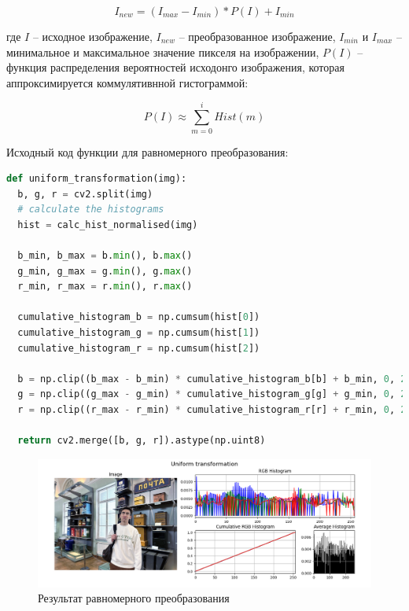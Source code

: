 \documentclass[a4paper, 12pt]{extarticle}
\begin{document}
\begin{equation}
  I_{new} = \left( I_{max} - I_{min} \right) * P(I) + I_{min}
\end{equation}

где $I$ -- исходное изображение, $I_{new}$ -- преобразованное изображение, $I_{min}$ и $I_{max}$ -- минимальное и максимальное значение пикселя на изображении, $P(I)$ -- функция распределения вероятностей исходонго изображения, которая аппроксимируется коммулятивнной гистограммой: 

\begin{equation}
  P(I) \approx \sum\limits_{m=0}^{i} Hist(m)
\end{equation}

Исходный код функции для равномерного преобразования:

\begin{lstlisting}[language=Python]
def uniform_transformation(img):
  b, g, r = cv2.split(img)
  # calculate the histograms
  hist = calc_hist_normalised(img)

  b_min, b_max = b.min(), b.max()
  g_min, g_max = g.min(), g.max()
  r_min, r_max = r.min(), r.max()

  cumulative_histogram_b = np.cumsum(hist[0]) 
  cumulative_histogram_g = np.cumsum(hist[1])
  cumulative_histogram_r = np.cumsum(hist[2])

  b = np.clip((b_max - b_min) * cumulative_histogram_b[b] + b_min, 0, 255)
  g = np.clip((g_max - g_min) * cumulative_histogram_g[g] + g_min, 0, 255)
  r = np.clip((r_max - r_min) * cumulative_histogram_r[r] + r_min, 0, 255)

  return cv2.merge([b, g, r]).astype(np.uint8)
\end{lstlisting}

\begin{figure}[h]
    \centering
    \includegraphics[width=\textwidth]{../results/Uniform transformation.png}
    \caption{Результат равномерного преобразования}
    \label{fig:uniform}
\end{figure}
\end{document}
